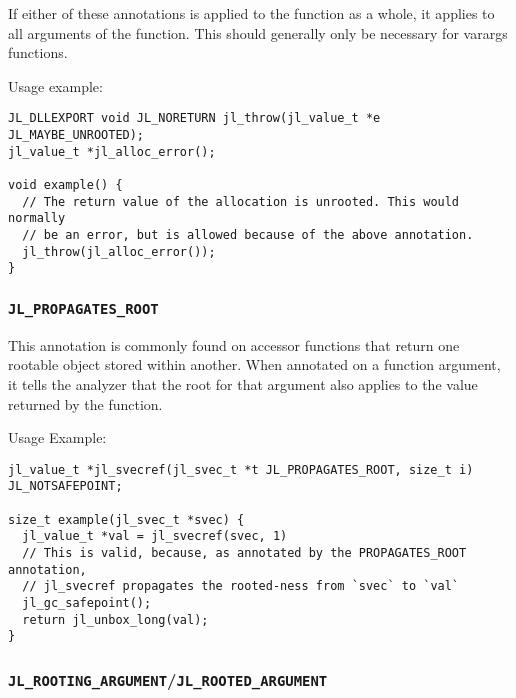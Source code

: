 If either of these annotations is applied to the function as a whole, it applies to all arguments of the function. This should generally only be necessary for varargs functions.



Usage example:




\begin{lstlisting}
JL_DLLEXPORT void JL_NORETURN jl_throw(jl_value_t *e JL_MAYBE_UNROOTED);
jl_value_t *jl_alloc_error();

void example() {
  // The return value of the allocation is unrooted. This would normally
  // be an error, but is allowed because of the above annotation.
  jl_throw(jl_alloc_error());
}
\end{lstlisting}



\hypertarget{8714501739065873603}{}


\subsubsection{\texttt{JL\_PROPAGATES\_ROOT}}



This annotation is commonly found on accessor functions that return one rootable object stored within another. When annotated on a function argument, it tells the analyzer that the root for that argument also applies to the value returned by the function.



Usage Example:




\begin{lstlisting}
jl_value_t *jl_svecref(jl_svec_t *t JL_PROPAGATES_ROOT, size_t i) JL_NOTSAFEPOINT;

size_t example(jl_svec_t *svec) {
  jl_value_t *val = jl_svecref(svec, 1)
  // This is valid, because, as annotated by the PROPAGATES_ROOT annotation,
  // jl_svecref propagates the rooted-ness from `svec` to `val`
  jl_gc_safepoint();
  return jl_unbox_long(val);
}
\end{lstlisting}



\hypertarget{78198301944071640}{}


\subsubsection{\texttt{JL\_ROOTING\_ARGUMENT}/\texttt{JL\_ROOTED\_ARGUMENT}}



